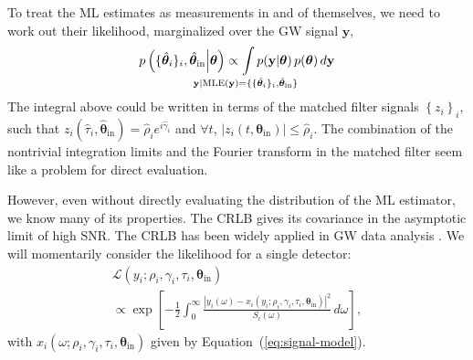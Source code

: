 \documentclass[amsmath,amssymb,aps,prx,reprint,nopreprintnumbers,nofootinbib]{revtex4-1}
\def\clap#1{\hbox to 0pt{\hss#1\hss}}
\def\mathclap{\mathpalette\mathclapinternal}
\def\mathclapinternal#1#2{\clap{$\mathsurround=0pt#1{#2}$}}
\begin{document}
To treat the ML estimates as measurements in and of themselves, we need to work out their likelihood, marginalized over the GW signal $\mathbf{y}$,
%
\begin{equation}\label{eq:detection-candidate-likelihood}
    p\left(\{\hat{\bm\theta}_i\}_i,
        \hat{\bm\theta}_\mathrm{in}
    \middle| \bm\theta\right)
    \propto \int\limits_{\mathclap{\mathbf{y} | \mathrm{MLE}(\mathbf{y}) =
        \{\{\hat{\bm\theta}_i\}_i,
        \hat{\bm\theta}_\mathrm{in}\}}}
    p(\mathbf{y} | \bm\theta) \, p(\bm\theta)
    \, d\mathbf{y}
\end{equation}
%
The integral above could be written in terms of the matched filter signals $\left\{z_i\right\}_i$, such that $z_i\left(\hat\tau_i, \hat{\bm\theta}_\mathrm{in}\right) = \hat\rho_i e^{i \hat\gamma_i}$ and $\forall t$, $\left|z_i(t, \bm\theta_\mathrm{in})\right| \leq \hat\rho_i$. The combination of the nontrivial integration limits and the Fourier transform in the matched filter seem like a problem for direct evaluation.

However, even without directly evaluating the distribution of the \ac{ML} estimator, we know many of its properties. The \ac{CRLB} gives its covariance in the asymptotic limit of high \ac{SNR}. The \ac{CRLB} has been widely applied in \ac{GW} data analysis \cite{fairhurst:2009}. We will momentarily consider the likelihood for a single detector:
%
\begin{multline}\label{eq:gaussian-likelihood-spa}
    \mathcal{L}\left(y_i; \rho_i, \gamma_i, \tau_i,
        \bm\theta_\mathrm{in}\right) \\
    \propto \exp \left[
        - \frac{1}{2} \int_0^\infty \frac{\left|y_i (\omega)
            - x_i\left(y_i; \rho_i, \gamma_i, \tau_i,
                \bm\theta_\mathrm{in}\right)
        \right|^2}{S_i(\omega)} \, d\omega
    \right],
\end{multline}
%
with $x_i(\omega; \rho_i, \gamma_i, \tau_i, \bm\theta_\mathrm{in})$ given by Equation~(\ref{eq:signal-model}).
\end{document}
